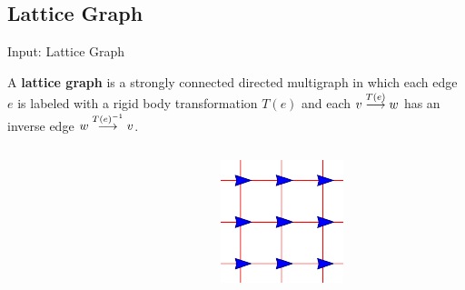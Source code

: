 \documentclass[10pt]{beamer}
\begin{document}
\subsection[Lattice Graph]{Lattice Graph}
\begin{frame}{Input: Lattice Graph}
  \begin{definition}
    A \textbf{lattice graph} is a strongly connected directed
      multigraph in which each edge $e$ is labeled with a rigid body
      transformation $T(e)$ and each ${v}\overset{T(e)}{\longrightarrow}{w}$ has an
      inverse edge ${w}\overset{T(e)^{-1}}{\longrightarrow}{v}$.  
    \end{definition}
    \begin{columns}[T] %
      \begin{column}{.45\textwidth}
        \begin{figure}
          \centering
        \end{figure}
      \end{column}%
      \begin{column}{.45\textwidth}
        \begin{figure}
          \centering
          \includegraphics[scale=1]{figs/squarelattice}
        \end{figure}
      \end{column}%
    \end{columns}
\end{frame}
\end{document}
